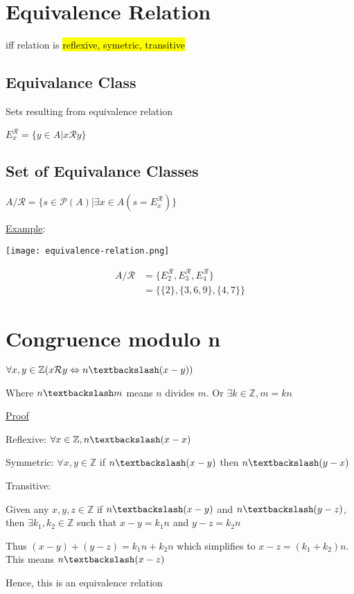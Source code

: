 \documentclass[12pt]{article}
\begin{document}
\begin{spacing}{1.5}
\section{Equivalence Relation}

iff relation is \hl{reflexive, symetric, transitive}

\subsection{Equivalance Class}

Sets resulting from equivalence relation

$E_x^{\mathcal{R}} = \{ y \in A | x \mathcal{R} y \}$

\subsection{Set of Equivalance Classes}

$A / \mathcal{R} = \{ s \in \mathcal{P}(A) | \exists x \in A (s = E_x^\mathcal{R}) \}$

\underline{Example}:

\texttt{[image: equivalence-relation.png]}

\begin{align}
A / \mathcal{R} &= \{ E_2^{\mathcal{R}}, E_3^{\mathcal{R}}, E_4^{\mathcal{R}} \} \\ 
 &= \{ \{ 2 \}, \{ 3, 6, 9 \}, \{ 4, 7 \} \}
\end{align}

\section{Congruence modulo n}

$\forall x, y \in \mathbb{Z} ( x \mathcal{R} y \Leftrightarrow n \textbackslash (x - y) )$

Where $n \textbackslash m$ means $n$ divides $m$. Or $\exists k \in \mathbb{Z},  m = kn$

\underline{Proof}

\begin{enumerate*}
	\item Reflexive: $\forall x \in \mathbb{Z}, n \textbackslash (x - x)$
	\item Symmetric: $\forall x, y \in \mathbb{Z}$ if $n \textbackslash (x - y)$ then $n \textbackslash (y - x)$
	\item Transitive: 
		\begin{enumerate*}
			\item Given any $x, y, z \in \mathbb{Z}$ if $n \textbackslash (x - y)$ and $n \textbackslash (y - z)$, then $\exists k_1, k_2 \in \mathbb{Z}$ such that $x - y = k_1 n$ and $y - z = k_2 n$
			\item Thus $(x - y) + (y - z) = k_1 n + k_2 n$ which simplifies to $x - z = (k_1 + k_2) n$. This means $n \textbackslash (x - z)$
		\end{enumerate*}
	\item Hence, this is an equivalence relation
\end{enumerate*}


\end{spacing}
\end{document}
